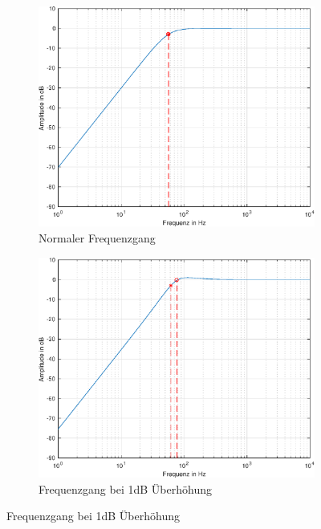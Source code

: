 \begin{figure}[bth]
    \centering
    \begin{subfigure}{.49\textwidth}
        \centering
        \includegraphics[width=0.85\linewidth]{Figures/Normaler_Frequenzgang.eps}
        \caption{Normaler Frequenzgang}
        \label{Normaler_Frequenzgang}
    \end{subfigure} 
    \begin{subfigure}{.49\textwidth}
        \centering
        \includegraphics[width=0.85\linewidth]{Figures/Frequenzgang_1dB.eps}
        \caption{Frequenzgang bei 1dB Überhöhung}
        \label{Frequenzgang_1dB}
    \end{subfigure}


\end{figure}
